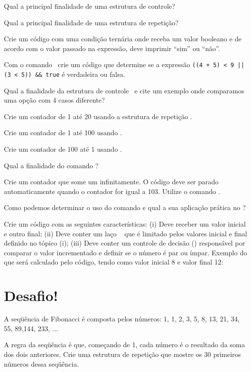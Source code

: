 \begin{description}[labelindent=30pt]
  \item [Q. 01] Qual a principal finalidade de uma estrutura de controle?
  \item [Q. 02] Qual a principal finalidade de uma estrutura de repetição?
  \item [Q. 03] Crie um código com uma condição ternária onde receba um valor booleano e 
  de acordo com o valor passado na expressão, deve imprimir ``sim'' ou ``não''.
  \item [Q. 04] Com o comando \comandoifelse~crie um código que determine se a expressão 
  \texttt{((4 + 5) < 9 || (3 < 5)) \&\& true} é verdadeira ou falsa.
  \item [Q. 05] Qual a finalidade da estrutura de controle \comandoswitch~e cite um exemplo onde comparamos 
  uma opção com 4 casos diferente?
  \item [Q. 06] Crie um contador de 1 até 20 usando a estrutura de repetição \comandowhile.
  \item [Q. 07] Crie um contador de 1 até 100 usando \comandodowhile.
  \item [Q. 08] Crie um contador de 100 até 1 usando \comandofor.
  \item [Q. 09] Qual a finalidade do comando \comandoforeach?
  \item [Q. 10] Crie um contador que some um infinitamente. O código deve ser parado automaticamente
  quando o contador for igual a 103. Utilize o comando \comandobreak. 
  \item [Q. 11] Como podemos determinar o uso do comando \comandocontinue e qual a sua aplicação prática
  no \php? 
  \item [Q. 12] Crie um código com as seguintes características: (i) Deve receber um valor inicial e outro
  final; (ii) Deve conter um laço \comandofor~ que é limitado pelos valores inicial e final definido no tópico
  (i); (iii) Deve conter um controle de decisão (\comandoifelse) responsável por comparar o valor incrementado
  e definir se o número é par ou ímpar. Exemplo do que será calculado pelo código, tendo como valor inicial
  8 e valor final 12:
  

\end{description}



\section{Desafio!}
\label{cap5-desafio}

A seqüência de Fibonacci é composta pelos números: 1, 1, 2, 3, 5, 8, 13, 21, 34, 55, 89,144, 233, ...

A regra da seqüência é que, começando de 1, cada número é o resultado da soma dos dois anteriores. Crie uma estrutura de repetição que mostre os 30 primeiros números dessa seqüência.